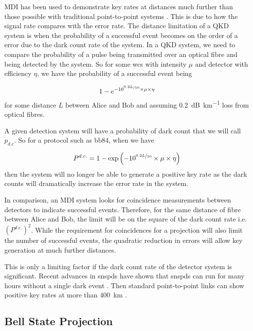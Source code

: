 \Ac{MDI} has been used to demonstrate key rates at distances much further than those possible with traditional point-to-point systems \cite{yin2016}. This is due to how the signal rate compares with the error rate. The distance limitation of a \ac{QKD} system is when the probability of a successful event becomes on the order of a error due to the dark count rate of the system. In a \ac{QKD} system, we  need to compare the probability of a pulse being transmitted over an optical fibre and being detected by the system. So for some \ac{wcs} with intensity $\mu$ and detector with efficiency $\eta$, we have the probability of a successful event being

\begin{equation}
	1 - e^{-10^{\nicefrac{0.2 L}{10}} \times \mu \times \eta}
\end{equation}
for some distance $L$ between Alice and Bob and assuming \SI{0.2}{dB\per\km} loss from optical fibres.

A given detection system will have a probability of dark count that we will call $p_{d.c}$. So for a protocol such as \ac{bb84}, when we have

\begin{equation}
	P^{d.c.} = 1 - \exp\left(-10^{\nicefrac{0.2 L}{10}} \times \mu \times \eta\right)
\end{equation}
then the system will no longer be able to generate a positive key rate as the dark counts will dramatically increase the error rate in the system.

In comparison, an \ac{MDI} system looks for coincidence measurements between detectors to indicate successful events. Therefore, for the same distance of fibre between Alice and Bob, the limit will be on the square of the dark count rate i.e.  $(P^{d.c.})^2$. While the requirement for coincidences for a projection will also limit the number of successful events, the quadratic reduction in errors will allow key generation at much further distances.

This is only a limiting factor if the dark count rate of the detector system is significant. Recent advances in \acp{snspd} have shown that \acp{snspd} can run for many hours without a single dark event \cite{wollman2017}. Then standard point-to-point links can show positive key rates at more than \SI{400}{\km} \cite{Boaron2018}.

\subsection{Bell State Projection}


